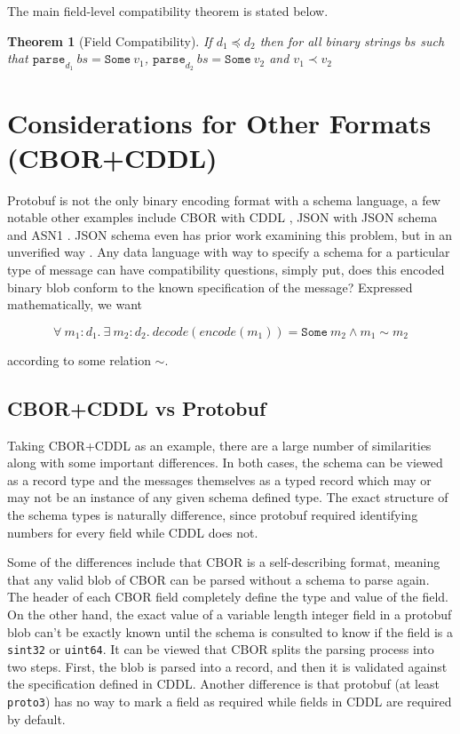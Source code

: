 \documentclass[11pt]{article}
\theoremstyle{definition}
\theoremstyle{plain}
\newtheorem{theorem}{Theorem}
\begin{document}
The main field-level compatibility theorem is stated below.
\\
\begin{theorem}[Field Compatibility]
  If $d_1 \preceq d_2$ then for all binary strings $bs$ such that
  $\mathtt{parse}_{d_1}\ bs = \mathtt{Some}\ v_1$, $\mathtt{parse}_{d_2}\ bs =
  \mathtt{Some}\ v_2$ and $v_1 \prec v_2$
\end{theorem}

\section{Considerations for Other Formats (CBOR+CDDL)}

Protobuf is not the only binary encoding format with a schema language, a few
notable other examples include CBOR with CDDL
\cite{birkholzConciseDataDefinition2019,bormannConciseBinaryObject2020}, JSON
with JSON schema
\cite{wrightJSONSchemaMedia2022,brayJavaScriptObjectNotation2017} and ASN1
\cite{ASN1EncodingRules2021}. JSON schema even has prior work examining this
problem, but in an unverified way \cite{habibFindingDataCompatibility2021}. Any
data language with way to specify a schema for a particular type of message can
have compatibility questions, simply put, does this encoded binary blob conform
to the known specification of the message? Expressed mathematically, we want

\[ \forall\ m_1:d_1.\ \exists\ m_2:d_2.\ decode(encode(m_1)) = \mathtt{Some}\ m_2 \wedge m_1 \sim m_2 \]

according to some relation $\sim$. 

\subsection{CBOR+CDDL vs Protobuf}

Taking CBOR+CDDL as an example, there are a large number of similarities along
with some important differences. In both cases, the schema can be viewed as a
record type and the messages themselves as a typed record which may or may not
be an instance of any given schema defined type. The exact structure of the
schema types is naturally difference, since protobuf required identifying
numbers for every field while CDDL does not.

Some of the differences include that CBOR is a self-describing format, meaning
that any valid blob of CBOR can be parsed without a schema to parse again. The
header of each CBOR field completely define the type and value of the field. On
the other hand, the exact value of a variable length integer field in a protobuf
blob can't be exactly known until the schema is consulted to know if the field
is a \texttt{sint32} or \texttt{uint64}. It can be viewed that CBOR splits the
parsing process into two steps. First, the blob is parsed into a record, and
then it is validated against the specification defined in CDDL. Another
difference is that protobuf (at least \texttt{proto3}) has no way to mark a
field as required while fields in CDDL are required by default.
\end{document}
